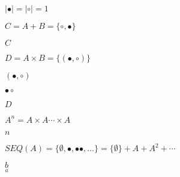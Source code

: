\documentclass[10pt]{book}
\begin{document}
\begin{mdSnippets}
\begin{mdInlineSnippet}[9890ec52a31052b345e3e7e4ae967df6]%
$|\bullet|=|\circ|=1$\end{mdInlineSnippet}%
\begin{mdInlineSnippet}[6d1c93504c1872dc0b12085290187078]%
$C = A+B = \{\circ, \bullet\}$\end{mdInlineSnippet}%
\begin{mdInlineSnippet}[0d61f8370cad1d412f80b84d143e1257]%
$C$\end{mdInlineSnippet}%
\begin{mdInlineSnippet}[23a03cfc484e1a7ba5d9895fa92211dc]%
$D = A\times B = \{(\bullet,\circ)\}$\end{mdInlineSnippet}%
\begin{mdInlineSnippet}[1160cc1178ec8a6c00a07350e8341957]%
$(\bullet,\circ)$\end{mdInlineSnippet}%
\begin{mdInlineSnippet}[c6cb23d9b364d9f46a407923dd42a0b0]%
$\bullet\circ$\end{mdInlineSnippet}%
\begin{mdInlineSnippet}[f623e75af30e62bbd73d6df5b50bb7b5]%
$D$\end{mdInlineSnippet}%
\begin{mdInlineSnippet}%
$A^n = A\times A \cdots \times A$\end{mdInlineSnippet}%
\begin{mdInlineSnippet}[7b8b965ad4bca0e41ab51de7b31363a1]%
$n$\end{mdInlineSnippet}%
\begin{mdInlineSnippet}[1bfe2dc575bd626e2684a4e7b52e3cd8]%
$A^n=\{\underbrace{n}{\bullet\bullet\cdots\bullet}}\}.$\end{mdInlineSnippet}%
\begin{mdInlineSnippet}[1482e22537fdc1c3ad506ab5a015b7d8]%
$SEQ(A)=\{\emptyset, \bullet, \bullet\bullet,\ldots\}=\{\emptyset\}+A+A^2+\cdots$\end{mdInlineSnippet}%
\begin{mdInlineSnippet}[a478dd4d62693e09f350052c7501f6b7]%
$\underset{a}{b}$\end{mdInlineSnippet}%
\begin{mdDisplaySnippet}[de189626c0f468f00af26235752660a7]%

\end{mdDisplaySnippet}
\end{mdSnippets}
\end{document}
